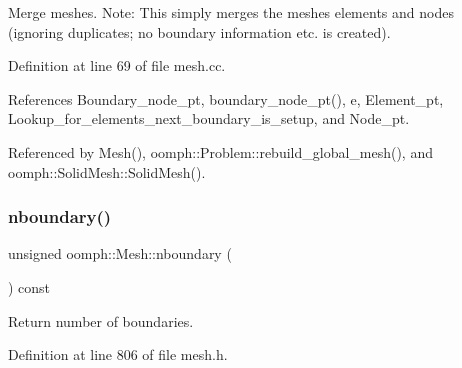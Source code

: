 Merge meshes. Note\+: This simply merges the meshes\textquotesingle{} elements and nodes (ignoring duplicates; no boundary information etc. is created). 

Definition at line 69 of file mesh.\+cc.



References Boundary\+\_\+node\+\_\+pt, boundary\+\_\+node\+\_\+pt(), e, Element\+\_\+pt, Lookup\+\_\+for\+\_\+elements\+\_\+next\+\_\+boundary\+\_\+is\+\_\+setup, and Node\+\_\+pt.



Referenced by Mesh(), oomph\+::\+Problem\+::rebuild\+\_\+global\+\_\+mesh(), and oomph\+::\+Solid\+Mesh\+::\+Solid\+Mesh().

\mbox{\label{classoomph_1_1Mesh_a84543564d6babe4faacbb9d87043fc19}} 
\subsubsection{\texorpdfstring{nboundary()}{nboundary()}}
{\footnotesize\ttfamily unsigned oomph\+::\+Mesh\+::nboundary (\begin{DoxyParamCaption}{ }\end{DoxyParamCaption}) const\hspace{0.3cm}{\ttfamily [inline]}}



Return number of boundaries. 



Definition at line 806 of file mesh.\+h.



